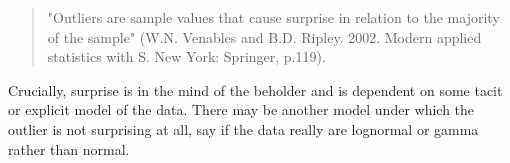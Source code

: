 

\begin{quote}
"Outliers are sample values that cause surprise in relation to the majority of the sample" (W.N. Venables and B.D. Ripley. 2002. Modern applied statistics with S. New York: Springer, p.119).
\end{quote}

Crucially, surprise is in the mind of the beholder and is dependent on some tacit or explicit model of the data. There may be another model under which the outlier is not surprising at all, say if the data really are lognormal or gamma rather than normal.


